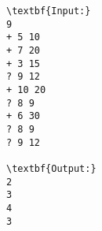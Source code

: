 \begin{verbatim}
\textbf{Input:}
9
+ 5 10
+ 7 20
+ 3 15
? 9 12
+ 10 20
? 8 9
+ 6 30
? 8 9
? 9 12

\textbf{Output:}
2
3
4
3\end{verbatim}